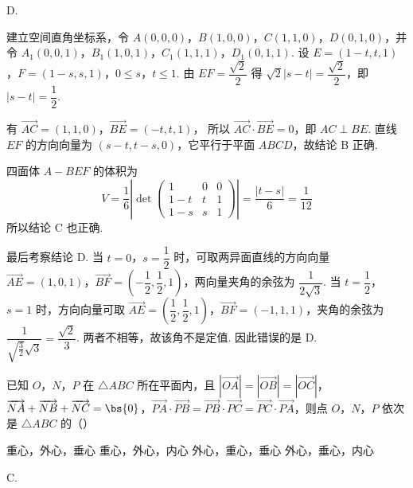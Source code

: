 \begin{answer}
D.
\end{answer}

\begin{solution}
建立空间直角坐标系，令
\(A(0,0,0)\)，\(B(1,0,0)\)，\(C(1,1,0)\)，\(D(0,1,0)\)，并令
\(A_1(0,0,1)\)，\(B_1(1,0,1)\)，\(C_1(1,1,1)\)，\(D_1(0,1,1)\). 设
\(E=(1-t,t,1)\)，\(F=(1-s,s,1)\)，\(0\leqslant s\)，\(t\leqslant1\).
由 \(EF=\dfrac{\sqrt2}{2}\) 得
\(\sqrt2|s-t|=\dfrac{\sqrt2}{2}\)，即 \(|s-t|=\dfrac12\).

有
\(\overrightarrow{AC}=(1,1,0)\)，\(\overrightarrow{BE}=(-t,t,1)\)，
所以 \(\overrightarrow{AC}\cdot\overrightarrow{BE}=0\)，即 \(AC\perp BE\). 直线 \(EF\) 的方向向量为 \((s-t,t-s,0)\)，它平行于平面 \(ABCD\)，故结论 B 正确.

四面体 \(A-BEF\) 的体积为
\[
V=\frac16\left|\det\begin{pmatrix}
1&0&0\\
1-t&t&1\\
1-s&s&1
\end{pmatrix}\right|
=\frac{|t-s|}{6}=\frac1{12}
\]
所以结论 C 也正确.

最后考察结论 D. 当 \(t=0\)，\(s=\dfrac12\) 时，可取两异面直线的方向向量
\(\overrightarrow{AE}=(1,0,1)\)，\(\overrightarrow{BF}=\left(-\dfrac12,\dfrac12,1\right)\)，两向量夹角的余弦为
\(\dfrac{1}{2\sqrt3}\). 当 \(t=\dfrac12\)，\(s=1\) 时，方向向量可取
\(\overrightarrow{AE}=\left(\dfrac12,\dfrac12,1\right)\)，\(\overrightarrow{BF}=(-1,1,1)\)，夹角的余弦为
\(\dfrac{1}{\sqrt{\frac{3}{2}}\sqrt3}=\dfrac{\sqrt2}{3}\). 两者不相等，故该角不是定值.
因此错误的是 D.
\end{solution}

\begin{problem}
已知 \(O\)，\(N\)，\(P\) 在 \(\triangle ABC\) 所在平面内，且 \(\left|\overrightarrow{OA}\right| = \left|\overrightarrow{OB}\right| = \left|\overrightarrow{OC}\right|\)，\(\overrightarrow{NA} + \overrightarrow{NB} + \overrightarrow{NC} = \bs{0}\)，\(\overrightarrow{PA} \cdot \overrightarrow{PB} = \overrightarrow{PB} \cdot \overrightarrow{PC} = \overrightarrow{PC} \cdot \overrightarrow{PA}\)，则点 \(O\)，\(N\)，\(P\) 依次是 \(\triangle ABC\) 的（\quad）

\choices
    {重心，外心，垂心}
    {重心，外心，内心}
    {外心，重心，垂心}
    {外心，垂心，内心}
\end{problem}

\begin{answer}
C.
\end{answer}

